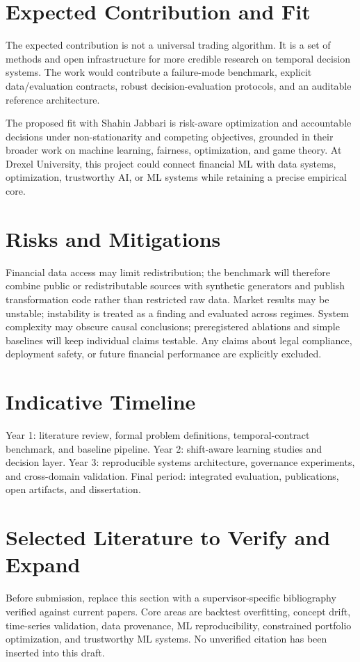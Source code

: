 \documentclass[11pt]{article}
\begin{document}
\section*{Expected Contribution and Fit}
The expected contribution is not a universal trading algorithm. It is a set of methods and open infrastructure for more credible research on temporal decision systems. The work would contribute a failure-mode benchmark, explicit data/evaluation contracts, robust decision-evaluation protocols, and an auditable reference architecture.

The proposed fit with Shahin Jabbari is risk-aware optimization and accountable decisions under non-stationarity and competing objectives, grounded in their broader work on machine learning, fairness, optimization, and game theory. At Drexel University, this project could connect financial ML with data systems, optimization, trustworthy AI, or ML systems while retaining a precise empirical core.

\section*{Risks and Mitigations}
Financial data access may limit redistribution; the benchmark will therefore combine public or redistributable sources with synthetic generators and publish transformation code rather than restricted raw data. Market results may be unstable; instability is treated as a finding and evaluated across regimes. System complexity may obscure causal conclusions; preregistered ablations and simple baselines will keep individual claims testable. Any claims about legal compliance, deployment safety, or future financial performance are explicitly excluded.

\section*{Indicative Timeline}
Year 1: literature review, formal problem definitions, temporal-contract benchmark, and baseline pipeline. Year 2: shift-aware learning studies and decision layer. Year 3: reproducible systems architecture, governance experiments, and cross-domain validation. Final period: integrated evaluation, publications, open artifacts, and dissertation.

\section*{Selected Literature to Verify and Expand}
Before submission, replace this section with a supervisor-specific bibliography verified against current papers. Core areas are backtest overfitting, concept drift, time-series validation, data provenance, ML reproducibility, constrained portfolio optimization, and trustworthy ML systems. No unverified citation has been inserted into this draft.
\end{document}
